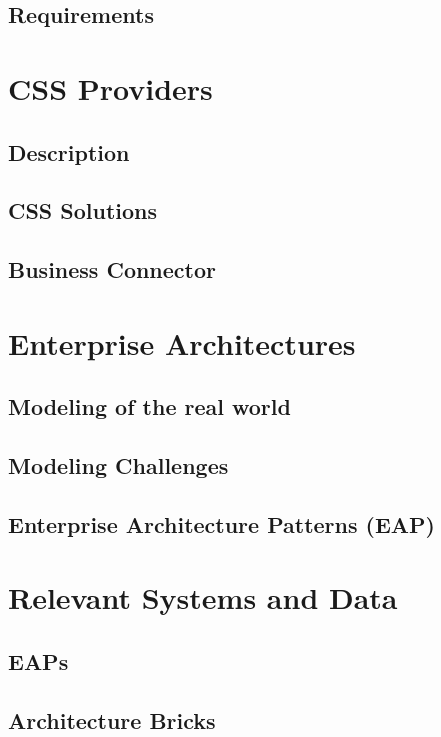 \documentclass[
     12pt,         %
     a4paper,      %
     BCOR10mm,     %
     DIV14,        %
     ]{scrreprt}
\begin{document}
\section{Requirements}

\chapter{CSS Providers}

\section{Description}

\section{CSS Solutions}

\section{Business Connector}

\chapter{Enterprise Architectures}

\section{Modeling of the real world}

\section{Modeling Challenges}

\section{Enterprise Architecture Patterns (EAP)}

\chapter{Relevant Systems and Data}

\section{EAPs}

\section{Architecture Bricks}
\end{document}
